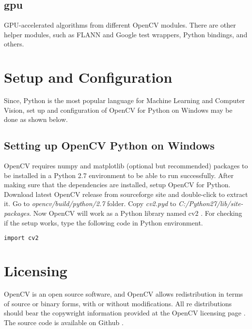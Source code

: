 \documentclass[9pt,twocolumn,twoside]{../../styles/osajnl}
\begin{document}
\subsection{gpu} GPU-accelerated algorithms from different OpenCV modules.
\newline There are other helper modules, such as FLANN and Google test wrappers, Python bindings, and others.

\section{Setup and Configuration}
Since, Python is the most popular language for Machine Learning and Computer Vision, set up and configuration of OpenCV for Python on Windows may be done as shown below.

\subsection{Setting up OpenCV Python on Windows}
OpenCV requires numpy and matplotlib (optional but recommended) packages to be installed in a Python 2.7 environment to be able to run successfully. After making sure that the dependencies are installed, setup OpenCV for Python. Download latest OpenCV release from sourceforge site \cite{www-opencv-sf} and double-click to extract it. Go to \textit{opencv/build/python/2.7} folder. Copy \textit{cv2.pyd} to \textit{C:/Python27/lib/site-packages}. Now OpenCV will work as a Python library named cv2 \cite{www-opencv-python}.
\newline For checking if the setup works, type the following code in Python environment.
\begin{Verbatim}
import cv2
\end{Verbatim}

\section{Licensing}
OpenCV is an open source software, and OpenCV allows redistribution in terms of source or binary forms, with or without modifications. All re distributions should bear the copywright information provided at the OpenCV licensing page \cite{www-opencv-license}. The source code is available on Github \cite{www-git-opencv}.
\end{document}
